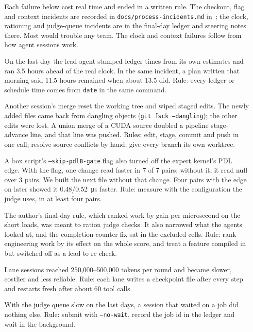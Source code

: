 \documentclass[11pt]{article}
\begin{document}
Each failure below cost real time and ended in a written rule. The checkout, flag
and context incidents are recorded in \nolinkurl{docs/process-incidents.md}
in~\cite{repo}; the clock, rationing and judge-queue incidents are in the
final-day ledger and steering notes there. Most
would trouble any team. The clock and context failures follow from how agent
sessions work.
\begin{description}[style=unboxed,leftmargin=0pt]
  \item[Estimated clocks.] On the last day the lead agent stamped ledger times from
  its own estimates and ran 3.5 hours ahead of the real clock. In the same
  incident, a plan written that morning said 11.5 hours remained when about 13.5
  did. Rule: every ledger or schedule time comes from \texttt{date} in the same
  command.
  \item[Shared checkouts.] Another session's merge reset the working tree and wiped
  staged edits. The newly added files came back from dangling objects
  (\texttt{git fsck --dangling}); the other edits were lost. A union merge of a CUDA
  source doubled a pipeline stage-advance line, and that line was pushed. Rules:
  edit, stage, commit and push in one call; resolve source conflicts by hand; give
  every branch its own worktree.
  \item[A flag that changed the experiment.] A box script's
  \texttt{--skip-pdl8-gate} flag also turned off the expert kernel's PDL edge. With
  the flag, one change read faster in 7 of 7 pairs; without it, it read null over 3
  pairs. We built the next file without that change. Four pairs with the edge on
  later showed it 0.48/\SI{0.52}{\micro\second} faster. Rule: measure with the
  configuration the judge uses, in at least four pairs.
  \item[Rationing that narrowed the search.] The author's final-day rule, which
  ranked work by gain per microsecond on the short loads, was meant to ration judge
  checks. It also
  narrowed what the agents looked at, and the completion-counter fix sat in the
  excluded cells. Rule: rank engineering work by its effect on the whole score, and
  treat a feature compiled in but switched off as a lead to re-check.
  \item[Context limits.] Lane sessions reached 250{,}000--500{,}000 tokens per round
  and became slower, costlier and less reliable. Rule: each lane writes a checkpoint
  file after every step and restarts fresh after about 60 tool calls.
  \item[An async judge.] With the judge queue slow on the last days, a session that
  waited on a job did nothing else. Rule: submit with \texttt{--no-wait}, record
  the job id in the ledger and wait in the background.
\end{description}
\end{document}
